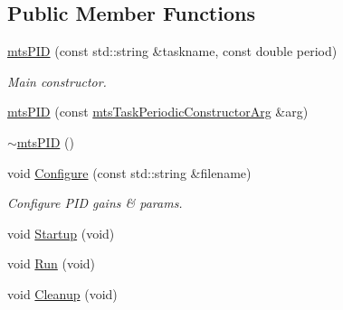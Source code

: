 \subsection*{Public Member Functions}
\begin{DoxyCompactItemize}
\item 
\hyperlink{classmts_p_i_d_a770a4941c1b444ec8aadd4585a73ada8}{mts\-P\-I\-D} (const std\-::string \&taskname, const double period)
\begin{DoxyCompactList}\small\item\em Main constructor. \end{DoxyCompactList}\item 
\hyperlink{classmts_p_i_d_a5382b49f6fbf4bdf80eae85e23b92abf}{mts\-P\-I\-D} (const \hyperlink{classmts_task_periodic_constructor_arg}{mts\-Task\-Periodic\-Constructor\-Arg} \&arg)
\item 
\hyperlink{classmts_p_i_d_abf4c7e2ceab5df1303764568d7234c5b}{$\sim$mts\-P\-I\-D} ()
\item 
void \hyperlink{classmts_p_i_d_a5a41aeb520a9007ecc12a2abded5bac5}{Configure} (const std\-::string \&filename)
\begin{DoxyCompactList}\small\item\em Configure P\-I\-D gains \& params. \end{DoxyCompactList}\item 
void \hyperlink{classmts_p_i_d_a2cea3d1dbc3ab7218ee00d67216a3c95}{Startup} (void)
\item 
void \hyperlink{classmts_p_i_d_a43f5e34d7a45a19fb9f2fa8685303e2e}{Run} (void)
\item 
void \hyperlink{classmts_p_i_d_acfd09cc46b2def93f7df99f2bd68bb49}{Cleanup} (void)
\end{DoxyCompactItemize}
